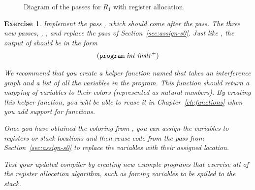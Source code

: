 \documentclass[11pt]{book}
\newtheorem{exercise}[theorem]{Exercise}
\begin{document}
\begin{figure}[p]
\caption{Diagram of the passes for $R_1$ with register allocation.}
\label{fig:reg-alloc-passes}
\end{figure}

\begin{exercise}\normalfont
  Implement the pass , which should come
  after the  pass. The three new passes,
  , , and
   replace the  pass of
  Section~\ref{sec:assign-s0}.  Just like , the
  output of  should be in the form
  \[
  (\texttt{program}\;\mathit{int}\;\mathit{instr}^{+})
  \]
  
  We recommend that you create a helper function named
   that takes an interference graph and a list of
  all the variables in the program. This function should return a
  mapping of variables to their colors (represented as natural
  numbers). By creating this helper function, you will be able to
  reuse it in Chapter~\ref{ch:functions} when you add support for
  functions.

  Once you have obtained the coloring from , you can
  assign the variables to registers or stack locations and then reuse
  code from the  pass from
  Section~\ref{sec:assign-s0} to replace the variables with their
  assigned location.
  
  Test your updated compiler by creating new example programs that
  exercise all of the register allocation algorithm, such as forcing
  variables to be spilled to the stack.
\end{exercise}
\end{document}
